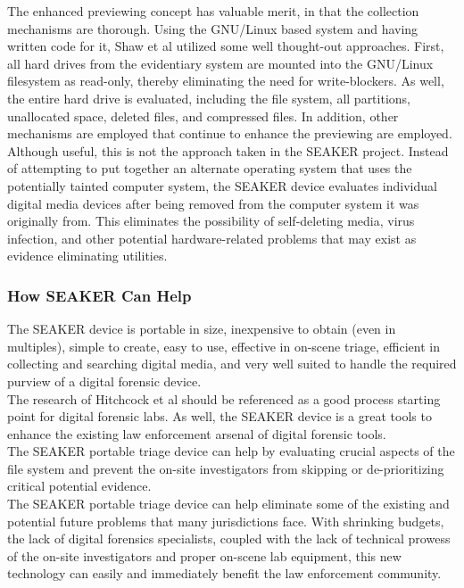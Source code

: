 \documentclass[12pt]{article}
\begin{document}
The enhanced previewing concept has valuable merit, in that the collection mechanisms
are thorough.  Using the GNU/Linux based system and having written code for it, Shaw 
et al\cite{shaw2013practical} utilized some well thought-out approaches.  First, all
hard drives from the evidentiary system are mounted into the GNU/Linux filesystem as
read-only, thereby eliminating the need for write-blockers.  As well, the entire hard
drive is evaluated, including the file system, all partitions, unallocated space,
deleted files, and compressed files.  In addition, other mechanisms are employed that
continue to enhance the previewing are employed.\\

Although useful, this is not the approach taken in the SEAKER project.  Instead
of attempting to put together an alternate operating system that uses the potentially
tainted computer system, the SEAKER device evaluates individual digital media
devices after being removed from the computer system it was originally from.  This
eliminates the possibility of self-deleting media, virus infection, and other 
potential hardware-related problems that may exist as evidence eliminating utilities.\\

\subsubsection{How SEAKER Can Help}

The SEAKER device is portable in size, inexpensive to obtain (even in multiples),
simple to create, easy to use, effective in on-scene triage, efficient in collecting and
searching digital media, and very well suited to handle the required purview of a digital
forensic device.\\

The research of Hitchcock et al\cite{hitchcock2016tiered} should be referenced as a good
process starting point for digital forensic labs.  As well, the SEAKER device is a 
great tools to enhance the existing law enforcement arsenal of digital forensic tools.\\

The SEAKER portable triage device can help by evaluating crucial
aspects of the file system and prevent the on-site investigators from skipping or
de-prioritizing critical potential evidence\cite{rogers2006computer}.\\

The SEAKER portable triage device can help eliminate some of the existing and
potential future problems that many jurisdictions face.  With shrinking budgets,
the lack of digital forensics specialists, coupled with the lack of technical prowess
of the on-site investigators and proper on-scene lab equipment\cite{rogers2006computer},
this new technology can easily and immediately benefit the law enforcement community.\\
\end{document}
